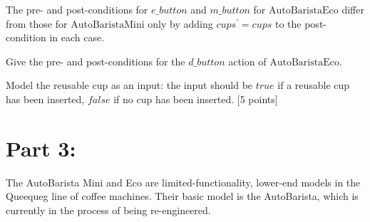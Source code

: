 \documentclass[12pt,fleqn]{article}
\begin{document}
\begin{enumerate}
The pre- and post-conditions for $e\_button$ and $m\_button$ for $\mathrm{AutoBaristaEco}$ differ from those for $\mathrm{AutoBaristaMini}$ only by adding $cups^\prime = cups$ to the post-condition in each case.

Give the pre- and post-conditions for the $d\_button$ action of $\mathrm{AutoBaristaEco}$.

Model the reusable cup as an input: the input should be $true$ if a reusable cup has been inserted, $false$ if no cup has been inserted. [5 points]




\clearpage

\section*{\sc Part 3:}

The AutoBarista Mini and Eco are limited-functionality, lower-end models in the Queequeg line of coffee machines. Their basic model is the AutoBarista, which is currently in the process of being re-engineered.


\end{enumerate}
\end{document}
